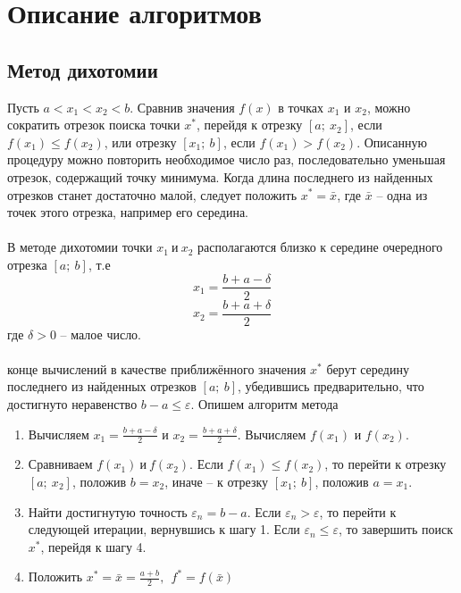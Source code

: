 \documentclass{article}
\begin{document}
\section{Описание алгоритмов}
\subsection{Метод дихотомии}
\noindent Пусть $a < x_1 < x_2 < b$. Сравнив значения $f(x)$ в точках $x_1$ и $x_2$, можно сократить отрезок поиска точки $x^{*}$, перейдя к отрезку $[a;~x_2]$, если $f(x_1)\le f(x_2)$, или отрезку $[x_1;~b]$, если $f(x_1)>f(x_2)$. Описанную процедуру можно повторить необходимое число раз, последовательно уменьшая отрезок, содержащий точку минимума. Когда длина последнего из найденных отрезков станет достаточно малой, следует положить $x^{*} = \bar x$, где $\bar x$ -- одна из точек этого отрезка, например его середина.
\\\\
\noindent В методе дихотомии точки $x_1~и~x_2$ располагаются близко к середине очередного отрезка $[a;~b]$, т.е
$$x_1=\frac{b+a-\delta}{2}$$
$$x_2=\frac{b+a+\delta}{2}$$
где $\delta>0$ -- малое число.
\\\\
 конце вычислений в качестве приближённого значения $x^{*}$ берут середину последнего из найденных отрезков $[a;~b]$, убедившись предварительно, что достигнуто неравенство $b-a \le \varepsilon$. Опишем алгоритм метода
\begin{enumerate}
    \item Вычисляем $x_1=\frac{b+a-\delta}{2}$ и $x_2=\frac{b+a+\delta}{2}$. Вычисляем $f(x_1)$ и $f(x_2)$.
    \item Сравниваем $f(x_1)~и~ f(x_2)$. Если $f(x_1)\le f(x_2)$, то перейти к отрезку $[a;~x_2]$, положив $b=x_2$, иначе -- к отрезку $[x_1;~b]$, положив $a=x_1$.
    \item Найти достигнутую точность $\varepsilon_n=b-a$. Если $\varepsilon_n>\varepsilon$, то перейти к следующей итерации, вернувшись к шагу 1. Если $\varepsilon_n\le \varepsilon$, то завершить поиск $x^{*}$, перейдя к шагу 4.
    \item Положить $x^{*}=\bar x = \frac{a+b}{2},~~f^{*}=f(\bar x)$
\end{enumerate}
\end{document}
